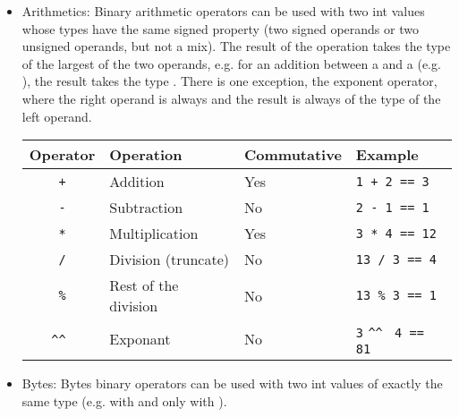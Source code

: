 \begin{itemize}
  \setlength\itemsep{-4pt}
\item Arithmetics: Binary arithmetic operators can be used with two int values
  whose types have the same signed property (two signed operands or two unsigned
  operands, but not a mix). The result of the operation takes the type of the
  largest of the two operands, e.g. for an addition between a  and a
   (e.g. ), the result takes the type
  . There is one exception, the exponent operator, where the right
  operand is always  and the result is always of the type of the
  left operand.

  \begin{center}
    \begin{adjustbox}{max width=1.0\linewidth}
      \begin{tabular}{|c|lll|}
        \hline
        Operator & Operation & Commutative & Example\\[0pt]
        \hline
        \hline
        \texttt{+} & Addition & Yes & \texttt{1 + 2 == 3}\\[0pt]
        \texttt{-} & Subtraction & No & \texttt{2 - 1 == 1}\\[0pt]
        \texttt{*} & Multiplication & Yes & \texttt{3 * 4 == 12}\\[0pt]
        \texttt{/} & Division (truncate) & No & \texttt{13 / 3 == 4}\\[0pt]
        \texttt{\%} & Rest of the division & No & \texttt{13 \% 3 == 1}\\[0pt]
        \verb~^^~ & Exponant & No & \texttt{3} \verb~^^~ \texttt{4 == 81}\\[0pt]
        \hline
      \end{tabular}
    \end{adjustbox}
  \end{center}

\item Bytes: Bytes binary operators can be used with two int values of exactly
  the same type (e.g.  with and only with ).


\end{itemize}
